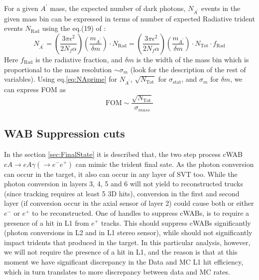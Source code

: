 \documentclass[letterpaper,12pt]{article}
\def \rarr {\rightarrow}
\def \dstl {\displaystyle}
\begin{document}
For a given $A^{\prime}$ mass, the expected number of dark photons, 
$\dstl N_{A^{\prime}}$ events in the given mass bin  can be expressed in terms of number of expected Radiative trident events $N_{\mathrm{Rad}}$ using the eq.(19) of \cite{AprimeFixedTargetTheory}:
\begin{equation}
 N_{A^{\prime}} = \left(\frac{\dstl 3\pi \epsilon^{2}}{\dstl 2 N_{f} \alpha}\right) \left( \frac{\dstl m_{A^{\prime}}}{\delta m} \right)\cdot N_{\mathrm{Rad}} = \left(\frac{\dstl 3\pi \epsilon^{2}}{\dstl 2 N_{f} \alpha}\right) \left( \frac{\dstl m_{A^{\prime}}}{\delta m} \right) \cdot N_{\mathrm{Tot}}\cdot f_{\mathrm{Rad}}
 \label{eq:NAprime}
\end{equation}
Here $f_{\mathrm{Rad}}$ is the radiative fraction, and $\delta m$ is the width of the mass bin which is proportional to the mass resolution $\sim \sigma_{m}$ (look \cite{AprimeFixedTargetTheory} for the description of the rest of variables). 
Using eq.\ref{eq:NAprime} for $N_{A^{\prime}}$, $\dstl\sqrt{N_{\mathrm{Tot}}}$ for 
$\sigma_{\mathrm{stat}}$, and $\dstl \sigma_{m}$ for $\delta m$, we can express FOM as
\begin{equation}
 \mathrm {FOM} \sim \frac{\dstl \sqrt{N_{\mathrm{Tot}}}}{\sigma_{mass}}
\end{equation}

\clearpage
\subsection{WAB Suppression cuts}
In the section \ref{sec:FinalState} it is described that, the two step process cWAB $eA\rarr eA\gamma(\rarr e^{-}e^{+})$ can mimic the trident final sate. As the photon conversion can occur in the target, it also can occur in any layer of SVT too. While the photon conversion in layers 3, 4, 5 and 6 will not yield to reconstructed trucks (since tracking requires at least 5 3D hits), conversion in the first and second layer (if conversion occur in the axial sensor of layer 2) could cause both or either $e^{-}$ or $e^{+}$ to be reconstructed. One of handles to suppress cWABs, is to require a presence of a hit in L1 from $e^{+}$ tracks. This should suppress cWABs significantly (photon conversions in L2 and in L1 stereo sensor), while should not significantly impact tridents that produced in the target. In this particular analysis, however, we will not require the presence of a hit in L1, and the reason is that at this moment we have significant discrepancy in the Data and MC L1 hit efficiency, which in turn translates to more discrepancy between data and MC rates.
\end{document}
